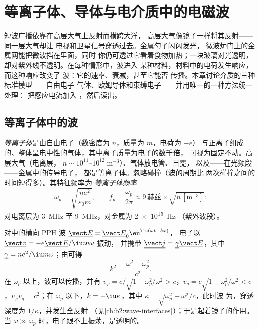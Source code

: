 \chapter{等离子体、导体与电介质中的电磁波}\label{ch:b2:waves-in-media}

短波广播依靠在高层大气上反射而横跨大洋，
高层大气像镜子一样将其反射——同一层大气却让
电视和卫星信号穿透过去。金属勺子闪闪发光，
微波炉门上的金属网能把微波挡在里面，同时
你仍可透过它看着食物加热；一块玻璃对光透明，
却对紫外线不透明。在每种情形中，波进入
某种材料，材料中的电荷发生响应，而这种响应改变了
波：它的速率、衰减，甚至它能否
传播。本章讨论介质的三种标准模型——自由电子
气体、欧姆导体和束缚电子——并用唯一的一种方法统一处理：
把感应电流加入
，然后读出。

\section{等离子体中的波}

\begin{definition}\label{def:b2:waves-in-media:plasma}
\emph{等离子体}是由自由电子（数密度为 $n$，质量为 $m$，电荷为 $-e$）
与正离子组成的、整体呈电中性的气体，其中离子质量为电子的数千倍，
可视为固定不动。高层大气（电离层，
$n \sim 10^{11}$--$10^{12}$ m$^{-3}$）、气体放电管、日冕，
以及——在光频段——金属中的传导电子，
都是等离子体。忽略碰撞（波的周期比
两次碰撞之间的时间短得多）。其特征频率为
\emph{等离子体频率}
\[
\omega_p = \sqrt{\frac{ne^2}{\varepsilon_0m}} , \qquad
f_p = \frac{\omega_p}{2\pi} \approx 9\,\text{赫兹}\times\sqrt{n\,[\text{m}^{-3}]} :
\]
对电离层为 \qty{3}{MHz} 至 \qty{9}{MHz}，对金属为 \qty{2e15}{Hz}
（紫外波段）。
\end{definition}

\begin{theorem}[等离子体的色散关系]\label{thm:b2:waves-in-media:plasmadispersion}
对中的横向 PPH 波 $\underline{\vect E} = \underline{\vect E}_0\eu^{\iu(\omega t - kx)}$，
电子以 $\underline{\vect v} = -e\underline{\vect E}/\iu m\omega$ 振动，
并携带 $\underline{\vect j} = \underline\gamma\underline{\vect E}$，其中
$\underline\gamma = ne^2/\iu m\omega$；由可得
\[
k^2 = \frac{\omega^2 - \omega_p^2}{c^2} .
\]
在 $\omega_p$ 以上，波可以传播，并有 $v_\varphi = c/\sqrt{1 - \omega_p^2/\omega^2}
> c$，$v_g = c\sqrt{1 - \omega_p^2/\omega^2} < c$，$v_\varphi v_g = c^2$；在
$\omega_p$ 以下，$k = -\iu\kappa$，其中 $\kappa = \sqrt{\omega_p^2 - \omega^2}/c$，此时波
为\emph{}，穿透深度为 $1/\kappa$，并发生全反射
（见\cref{ch:b2:wave-interfaces}）；于是起着镜子的作用。当 $\omega
\gg \omega_p$ 时，电子跟不上振荡，是透明的。
\end{theorem}


